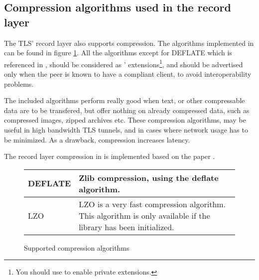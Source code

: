 \subsection*{Compression algorithms used in the record layer}
The TLS' record layer also supports compression. The algorithms
implemented in \gnutls{} can be found in figure \ref{fig:compression}.
All the algorithms except for DEFLATE which is referenced in \cite{TLSCOMP}, should be 
considered as \gnutls' extensions\footnote{You should use 
to enable private extensions.}, and
should be advertised only when the peer is known to have a compliant client,
to avoid interoperability problems.
\par
The included algorithms perform really good when text, or other
compressable data are to be transfered, but offer nothing on already 
compressed data, such as compressed images, zipped archives etc.
These compression algorithms, may be useful in high bandwidth TLS tunnels,
and in cases where network usage has to be minimized. As a drawback, 
compression increases latency.

\par
The record layer compression in \gnutls{} is implemented based on
the paper \cite{TLSCOMP}.

\begin{figure}[hbtp]
\begin{tabular}{|l|p{9cm}|}

\hline
DEFLATE & Zlib compression, using the deflate algorithm.
\\
\hline
LZO & LZO is a very fast compression algorithm. This algorithm is only
available if the \gnutlse{} library has been initialized.
\\
\hline
\end{tabular}
\caption{Supported compression algorithms}
\label{fig:compression}
\end{figure}


